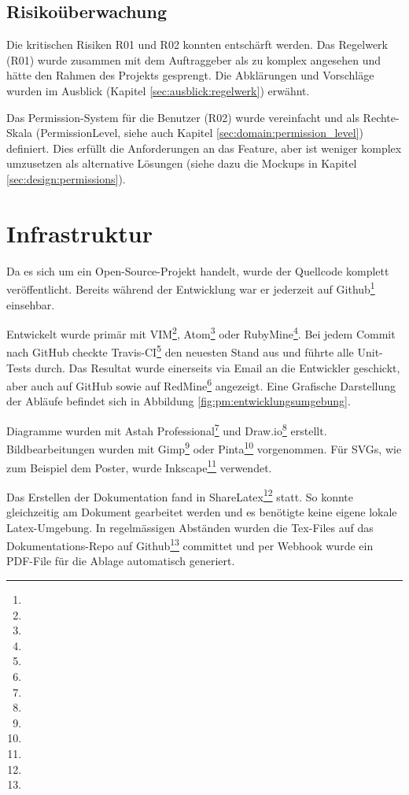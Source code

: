 \subsection*{Risikoüberwachung}

Die kritischen Risiken R01 und R02 konnten entschärft werden. Das Regelwerk (R01) wurde zusammen mit dem Auftraggeber als zu komplex angesehen und hätte den Rahmen des Projekts gesprengt. Die Abklärungen und Vorschläge wurden im Ausblick (Kapitel \ref{sec:ausblick:regelwerk}) erwähnt.

Das Permission-System für die Benutzer (R02) wurde vereinfacht und als Rechte-Skala (PermissionLevel, siehe auch Kapitel \ref{sec:domain:permission_level}) definiert. Dies erfüllt die Anforderungen an das Feature, aber ist weniger komplex umzusetzen als alternative Lösungen (siehe dazu die Mockups in Kapitel \ref{sec:design:permissions}).

\xxx[Comment zu R07!]


\section{Infrastruktur} \label{sec:pm:infrastructure}

Da es sich um ein Open-Source-Projekt handelt, wurde der Quellcode komplett veröffentlicht. Bereits während der Entwicklung war er jederzeit auf Github\footnote{} einsehbar.

Entwickelt wurde primär mit VIM\footnote{}, Atom\footnote{} oder RubyMine\footnote{}. Bei jedem Commit nach GitHub checkte Travis-CI\footnote{} den neuesten Stand aus und führte alle Unit-Tests durch. Das Resultat wurde einerseits via Email an die Entwickler geschickt, aber auch auf GitHub sowie auf RedMine\footnote{} angezeigt. Eine Grafische Darstellung der Abläufe befindet sich in Abbildung \ref{fig:pm:entwicklungsumgebung}.


Diagramme wurden mit Astah Professional\footnote{} und Draw.io\footnote{} erstellt. Bildbearbeitungen wurden mit Gimp\footnote{} oder Pinta\footnote{} vorgenommen. Für SVGs, wie zum Beispiel dem Poster, wurde Inkscape\footnote{} verwendet.

Das Erstellen der Dokumentation fand in ShareLatex\footnote{} statt. So konnte gleichzeitig am Dokument gearbeitet werden und es benötigte keine eigene lokale Latex-Umgebung. In regelmässigen Abständen wurden die Tex-Files auf das Dokumentations-Repo auf Github\footnote{} committet und per Webhook wurde ein PDF-File für die Ablage automatisch generiert.

